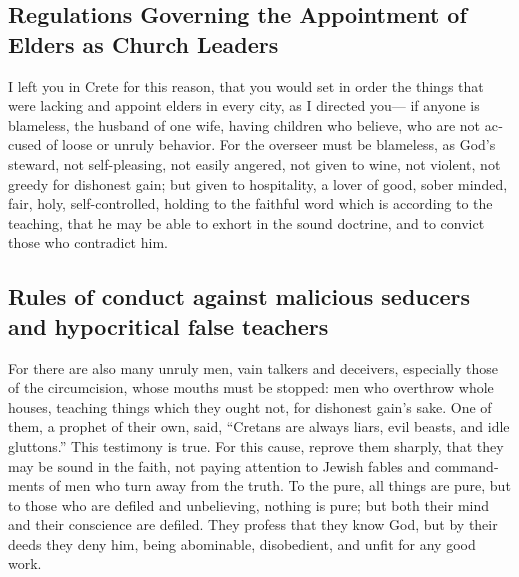 \begin{paracol}{2}
\begin{otherlanguage}{english}
\hypertarget{regulations-governing-the-appointment-of-elders-as-church-leaders}{%
\subsection{Regulations Governing the Appointment of Elders as Church
Leaders}\label{regulations-governing-the-appointment-of-elders-as-church-leaders}}

 I left you in Crete for this reason, that you would set
in order the things that were lacking and appoint elders in every city,
as I directed you---  if anyone is blameless, the husband
of one wife, having children who believe, who are not accused of loose
or unruly behavior.  For the overseer must be blameless,
as God's steward, not self-pleasing, not easily angered, not given to
wine, not violent, not greedy for dishonest gain;  but
given to hospitality, a lover of good, sober minded, fair, holy,
self-controlled,  holding to the faithful word which is
according to the teaching, that he may be able to exhort in the sound
doctrine, and to convict those who contradict him.

\hypertarget{rules-of-conduct-against-malicious-seducers-and-hypocritical-false-teachers}{%
\subsection{Rules of conduct against malicious seducers and hypocritical
false
teachers}\label{rules-of-conduct-against-malicious-seducers-and-hypocritical-false-teachers}}

 For there are also many unruly men, vain talkers and
deceivers, especially those of the circumcision,  whose
mouths must be stopped: men who overthrow whole houses, teaching things
which they ought not, for dishonest gain's sake.  One of
them, a prophet of their own, said, ``Cretans are always liars, evil
beasts, and idle gluttons.''  This testimony is true. For
this cause, reprove them sharply, that they may be sound in the faith,
 not paying attention to Jewish fables and commandments
of men who turn away from the truth.  To the pure, all
things are pure, but to those who are defiled and unbelieving, nothing
is pure; but both their mind and their conscience are defiled.
 They profess that they know God, but by their deeds they
deny him, being abominable, disobedient, and unfit for any good work.


\end{otherlanguage}
\end{paracol}
